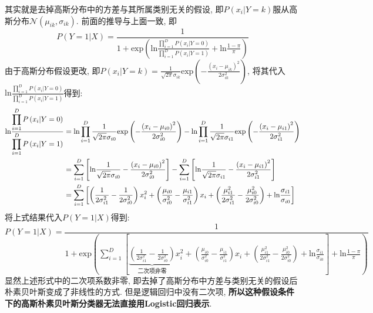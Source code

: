 \documentclass{article}
\begin{document}
\begin{homeworkProblem}
	\solution 其实就是去掉高斯分布中的方差与其所属类别无关的假设, 即$P(x_i|Y=k)$服从高斯分布$\mathcal{N}(\mu_{ik},\sigma_{ik})$. 前面的推导与上面一致, 即
	$$
	P\left( Y=1|X \right) =\frac{1}{1+\text{exp} \left(\displaystyle  \text{ln} \frac{\displaystyle \prod_{i=1}^D{P\left( x_i|Y=0 \right)}}{\displaystyle \prod_{i=1}^D{P\left( x_i|Y=1 \right)}}+\text{ln} \frac{1-\pi}{\pi} \right)}
	$$
	由于高斯分布假设更改, 即$\displaystyle P\left( x_i|Y=k \right) =\frac{1}{\sqrt{2\pi}\sigma _{ik}}\text{exp} \left( -\frac{\left( x_i-\mu _{ik} \right) ^2}{2\sigma _{ik}^{2}} \right)$, 将其代入$\text{ln} \frac{\displaystyle \prod_{i=1}^D{P\left( x_i|Y=0 \right)}}{\displaystyle \prod_{i=1}^D{P\left( x_i|Y=1 \right)}}$得到:
	\begin{align}
		\text{ln} \frac{\displaystyle \prod_{i=1}^D{P\left( x_i|Y=0 \right)}}{\displaystyle \prod_{i=1}^D{P\left( x_i|Y=1 \right)}}&=\text{ln} \prod_{i=1}^D{\frac{1}{\sqrt{2\pi}\sigma _{i0}}\text{exp} \left( -\frac{\left( x_i-\mu _{i0} \right) ^2}{2\sigma _{i0}^{2}} \right)}-\text{ln} \prod_{i=1}^D{\frac{1}{\sqrt{2\pi}\sigma _{i1}}\text{exp} \left( -\frac{\left( x_i-\mu _{i1} \right) ^2}{2\sigma _{i1}^{2}} \right)} \notag
		\\
		&=\sum_{i=1}^D{\left[ \text{ln} \frac{1}{\sqrt{2\pi}\sigma _{i0}}-\frac{\left( x_i-\mu _{i0} \right) ^2}{2\sigma _{i0}^{2}} \right]}-\sum_{i=1}^D{\left[ \text{ln} \frac{1}{\sqrt{2\pi}\sigma _{i1}}-\frac{\left( x_i-\mu _{i1} \right) ^2}{2\sigma _{i1}^{2}} \right]} \notag
		\\
		&=\sum_{i=1}^D{\left[ \left( \frac{1}{2\sigma _{i1}^{2}}-\frac{1}{2\sigma _{i0}^{2}} \right) x_{i}^{2}+\left( \frac{\mu _{i0}}{\sigma _{i0}^{2}}-\frac{\mu _{i1}}{\sigma _{i1}^{2}} \right) x_i+\left( \frac{\mu _{i1}^{2}}{2\sigma _{i1}^{2}}-\frac{\mu _{i0}^{2}}{2\sigma _{i0}^{2}} \right) +\text{ln} \frac{\sigma _{i1}}{\sigma _{i0}} \right]} \notag
	\end{align}
	将上式结果代入$P(Y=1|X)$得到:
	$$
	P\left( Y=1|X \right) =\frac{1}{1+\text{exp} \left( \displaystyle \sum_{i=1}^D{\left[ \underset{\text{二次项非零}}{\underbrace{\left( \frac{1}{2\sigma _{i1}^{2}}-\frac{1}{2\sigma _{i0}^{2}} \right) }}x_{i}^{2}+\left( \frac{\mu _{i0}}{\sigma _{i0}^{2}}-\frac{\mu _{i1}}{\sigma _{i1}^{2}} \right) x_i+\left( \frac{\mu _{i1}^{2}}{2\sigma _{i1}^{2}}-\frac{\mu _{i0}^{2}}{2\sigma _{i0}^{2}} \right) +\text{ln} \frac{\sigma _{i1}}{\sigma _{i0}} \right]}+\text{ln} \frac{1-\pi}{\pi} \right)}
	$$
	显然上述形式中的二次项系数非零, 即去掉了高斯分布中方差与类别无关的假设后朴素贝叶斯变成了非线性的方式. 但是逻辑回归中没有二次项, \textbf{所以这种假设条件下的高斯朴素贝叶斯分类器无法直接用Logistic回归表示}.
	\newpage


\end{homeworkProblem}
\end{document}
